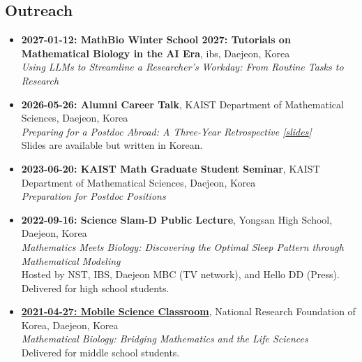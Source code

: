 \documentclass[margin,line]{res}
\begin{document}
\begin{resume}
\section{\sc Outreach}
\begin{itemize}[leftmargin=0pt, label={}]
    \item \textbf{2027-01-12: MathBio Winter School 2027: Tutorials on Mathematical Biology in the AI Era}, ibs, Daejeon, Korea \\
    \textit{Using LLMs to Streamline a Researcher’s Workday: From Routine Tasks to Research}
    \item \textbf{2026-05-26: Alumni Career Talk}, KAIST Department of Mathematical Sciences, Daejeon, Korea \\
    \textit{Preparing for a Postdoc Abroad: A Three-Year Retrospective [\href{https://github.com/HyukpyoHong/HyukpyoHong.github.io/releases/download/talks-2026/20260526_KAIST-postdoc-prep.pdf}{\ul{slides}}]} \\
    Slides are available but written in Korean.
    \item \textbf{2023-06-20: KAIST Math Graduate Student Seminar}, KAIST Department of Mathematical Sciences, Daejeon, Korea \\
    \textit{Preparation for Postdoc Positions}
    \item \textbf{2022-09-16: Science Slam-D Public Lecture}, Yongsan High School, Daejeon, Korea \\
    \textit{Mathematics Meets Biology: Discovering the Optimal Sleep Pattern through Mathematical Modeling} \\
    Hosted by NST, IBS, Daejeon MBC (TV network), and Hello DD (Press). Delivered for high school students.
    \item \href{https://youtu.be/MyAU7jTFzMc?feature=shared}{\textbf{2021-04-27: Mobile Science Classroom}}, National Research Foundation of Korea, Daejeon, Korea \\
    \textit{Mathematical Biology: Bridging Mathematics and the Life Sciences} \\
    Delivered for middle school students.
\end{itemize}

\vspace{-8pt}
\end{resume}
\end{document}
